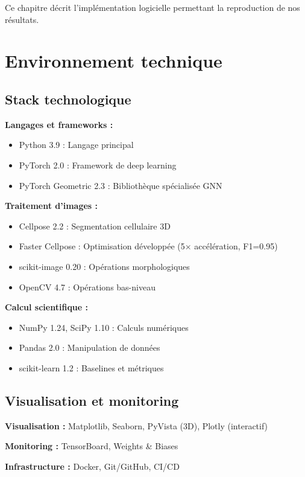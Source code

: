 Ce chapitre décrit l'implémentation logicielle permettant la reproduction de nos résultats.

\section{Environnement technique}

\subsection{Stack technologique}

\textbf{Langages et frameworks :}
\begin{itemize}
    \item Python 3.9 : Langage principal
    \item PyTorch 2.0 : Framework de deep learning
    \item PyTorch Geometric 2.3 : Bibliothèque spécialisée GNN
\end{itemize}

\textbf{Traitement d'images :}
\begin{itemize}
    \item Cellpose 2.2 : Segmentation cellulaire 3D
    \item Faster Cellpose : Optimisation développée (5× accélération, F1=0.95)
    \item scikit-image 0.20 : Opérations morphologiques
    \item OpenCV 4.7 : Opérations bas-niveau
\end{itemize}

\textbf{Calcul scientifique :}
\begin{itemize}
    \item NumPy 1.24, SciPy 1.10 : Calculs numériques
    \item Pandas 2.0 : Manipulation de données
    \item scikit-learn 1.2 : Baselines et métriques
\end{itemize}

\subsection{Visualisation et monitoring}

\textbf{Visualisation :} Matplotlib, Seaborn, PyVista (3D), Plotly (interactif)

\textbf{Monitoring :} TensorBoard, Weights \& Biases

\textbf{Infrastructure :} Docker, Git/GitHub, CI/CD

